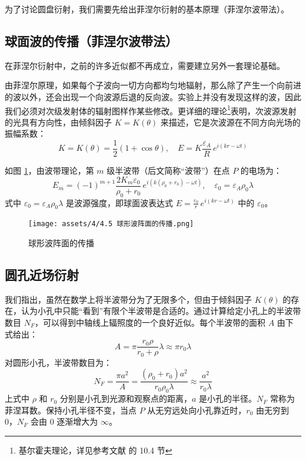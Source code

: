 \documentclass[UTF8]{report}
\theoremstyle{MyLineTheoremStyle} %
\theoremstyle{MyBlockTheoremStyle} %
\theoremstyle{MySubsubsectionStyle} %
\begin{document}
为了讨论圆盘衍射，我们需要先给出菲涅尔衍射的基本原理（菲涅尔波带法）。

\subsection{球面波的传播（菲涅尔波带法）}

在菲涅尔衍射中，之前的许多近似都不再成立，需要建立另外一套理论基础。

由菲涅尔原理，如果每个子波向一切方向都均匀地辐射，那么除了产生一个向前进的波以外，还会出现一个向波源后退的反向波。实验上并没有发现这样的波，因此我们必须对次级发射体的辐射图样作某些修改。更详细的理论\footnote{基尔霍夫理论，详见参考文献 \cite{Optics} 的 10.4 节}表明，次波源发射的光具有方向性，由倾斜因子 $K = K(\theta)$ 来描述，它是次波源在不同方向光场的振幅系数：
\begin{equation}
    K = K(\theta) = \frac{1}{2}\left(1 + \cos \theta\right),\quad E = K\frac{\varepsilon_A}{R} \,e^{i(kr - \omega t)}
\end{equation}

如图 \ref{球形波阵面的传播}，由波带理论，第 $m$ 级半波带（后文简称“波带”）在点 $P$ 的电场为：
\begin{equation}
E_m = (-1)^{m+1} \frac{2 K_m \varepsilon_0}{\rho_0 + r_0} \,e^{i\left(k(\rho_0 + r_0) - \omega t\right)},\quad \varepsilon_0 = \varepsilon_A \rho_0 \lambda
\end{equation}
式中 $\varepsilon_0 = \varepsilon_A \rho_0 \lambda$ 是波源强度，即球面波表达式 $E = \frac{\varepsilon_0}{r} \,e^{i(kr - \omega t)}$ 中的 $\varepsilon_0$。

\begin{figure}[H]\centering
    \texttt{[image: assets/4/4.5 球形波阵面的传播.png]}
    \caption{球形波阵面的传播}\label{球形波阵面的传播}
\end{figure}

\subsection{圆孔近场衍射}

我们指出，虽然在数学上将半波带分为了无限多个，但由于倾斜因子 $K(\theta)$ 的存在，认为小孔中只能“看到”有限个半波带是合适的。通过计算给定小孔上的半波带数目 $N_F$，可以得到中轴线上辐照度的一个良好近似。每个半波带的面积 $A$ 由下式给出：
\begin{equation}
A = \pi \frac{r_0 \rho}{r_0 + \rho} \lambda \approx \pi r_0 \lambda
\end{equation}
对圆形小孔，半波带数目为：
\begin{equation}
N_F = \frac{\pi a^2}{A} = \frac{(\rho_0 + r_0)a^2 }{r_0 \rho_0 \lambda} \approx \frac{a^2}{ r_0 \lambda}
\end{equation}
上式中 $\rho$ 和 $r_0$ 分别是小孔到光源和观察点的距离，$a$ 是小孔的半径。$N_F$ 常称为菲涅耳数。保持小孔半径不变，当点 $P$ 从无穷远处向小孔靠近时，$r_0$ 由无穷到 0，$N_F$ 会由 $0$ 逐渐增大为 $\infty$。
\end{document}
